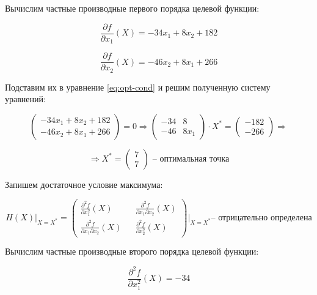 Вычислим частные производные первого порядка целевой функции:

\begin{equation*}
	\frac{\partial f}{\partial x_1}(X) = -34 x_1 + 8 x_2 + 182
\end{equation*}

\begin{equation*}
	\frac{\partial f}{\partial x_2}(X) = -46 x_2 + 8 x_1 + 266
\end{equation*}

Подставим их в уравнение \ref{eq:opt-cond} и решим полученную систему уравнений:

\begin{equation*}
	\begin{pmatrix}
		-34 x_1 + 8 x_2 + 182
		\\
		-46 x_2 + 8 x_1 + 266
	\end{pmatrix}
	= 0
	\Rightarrow
	\begin{pmatrix}
		-34 & 8
		\\
		-46 & 8 x_1
	\end{pmatrix}
	\cdot X^* =
	\begin{pmatrix}
		-182
		\\
		-266
	\end{pmatrix}
	\Rightarrow
\end{equation*}

\begin{equation*}
	\Rightarrow X^* = 
	\begin{pmatrix}
		7
		\\
		7
	\end{pmatrix}
	\text{ -- оптимальная точка}
\end{equation*}

Запишем достаточное условие максимума:

\begin{equation}
\label{eq:enough-cond}
	H(X) \Big|_{X=X^*} = 
	\begin{pmatrix}
		\frac{\partial^2 f}{\partial x^2_1}(X) && \frac{\partial^2 f}{\partial x_1 \partial x_2}(X)
		\\
		\frac{\partial^2 f}{\partial x_1 \partial x_2}(X) && \frac{\partial^2 f}{\partial x^2_2}(X)
	\end{pmatrix}
	\Big|_{X=X^*}
	\text{-- отрицательно определена}
\end{equation}

Вычислим частные производные второго порядка целевой функции:

\begin{equation*}
	\frac{\partial^2 f}{\partial x^2_1}(X) = -34
\end{equation*}

